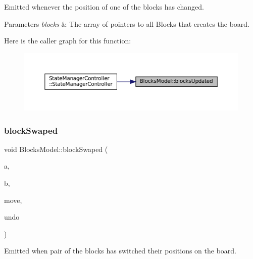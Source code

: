 Emitted whenever the position of one of the blocks has changed. 


\begin{DoxyParams}{Parameters}
{\em blocks} & The array of pointers to all Blocks that creates the board. \\
\hline
\end{DoxyParams}
Here is the caller graph for this function\+:
\nopagebreak
\begin{figure}[H]
\begin{center}
\leavevmode
\includegraphics[width=350pt]{class_blocks_model_ab2870995b5c7936d0e0f7afe41e7fbeb_icgraph}
\end{center}
\end{figure}
\mbox{\label{class_blocks_model_a7fb837fa85f6de3b9e3bc56a590f734e}} 
\subsubsection{\texorpdfstring{blockSwaped}{blockSwaped}}
{\footnotesize\ttfamily void Blocks\+Model\+::block\+Swaped (\begin{DoxyParamCaption}\item[{\mbox{\hyperlink{class_block}{Block}}$<$ \mbox{\hyperlink{class_block_layout_item}{Block\+Layout\+Item}} $>$ \&}]{a,  }\item[{\mbox{\hyperlink{class_block}{Block}}$<$ \mbox{\hyperlink{class_block_layout_item}{Block\+Layout\+Item}} $>$ \&}]{b,  }\item[{const std\+::shared\+\_\+ptr$<$ \mbox{\hyperlink{struct_move}{Move}} $>$ \&}]{move,  }\item[{bool}]{undo }\end{DoxyParamCaption})\hspace{0.3cm}{\ttfamily [signal]}}



Emitted when pair of the blocks has switched their positions on the board. 


